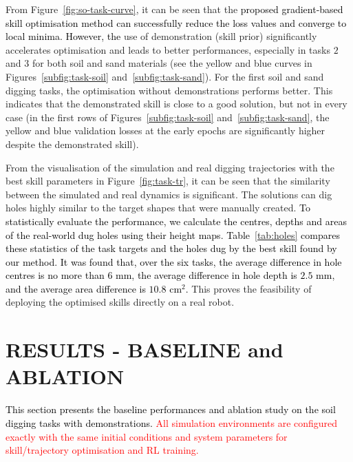 \documentclass[letterpaper, 10 pt, journal, twoside]{ieeetran}
\newcommand{\rp}[1]{\textcolor{black}{#1}}
\newcommand{\rps}[1]{\textcolor{red}{#1}}
\begin{document}
From Figure~\ref{fig:so-task-curve}, it can be seen that the \rp{proposed gradient-based skill optimisation method can successfully reduce the loss values and converge to local minima. However, the} use of demonstration (skill prior) significantly accelerates optimisation and leads to better performances, especially in tasks $2$ and $3$ for both soil and sand materials (see the yellow and blue curves in Figures~\ref{subfig:task-soil} and~\ref{subfig:task-sand}). For the first soil and sand digging tasks, the optimisation without demonstrations performs better. This indicates that the demonstrated skill is close to a good solution, but not in every case (in the first rows of Figures~\ref{subfig:task-soil} and~\ref{subfig:task-sand}, the yellow and blue validation losses at the early epochs are significantly higher despite the demonstrated skill).

From the visualisation of the simulation and real digging trajectories with the best skill parameters in Figure~\ref{fig:task-tr}, it can be seen that the similarity between the simulated and real dynamics is significant. The solutions can dig holes highly similar to the target shapes that were manually created. \rp{To statistically evaluate the performance, we calculate the centres, depths and areas of the real-world dug holes using their height maps. Table~\ref{tab:holes} compares these statistics of the task targets and the holes dug by the best skill found by our method. It was found that, over the six tasks, the average difference in hole centres is no more than $6$ mm, the average difference in hole depth is $2.5$ mm, and the average area difference is $10.8$ cm$^2$.} This proves the feasibility of deploying the optimised skills directly on a real robot.

\section{RESULTS - BASELINE and ABLATION}\label{sec:ablation}
\rp{This section presents the baseline performances and ablation study on the soil digging tasks with demonstrations.} \rps{All simulation environments are configured exactly with the same initial conditions and system parameters for skill/trajectory optimisation and RL training.}
\end{document}
